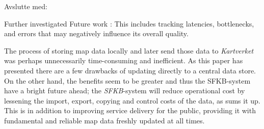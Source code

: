 Avslutte med:



Further investigated 	Future work : This includes tracking latencies, bottlenecks, and errors that may negatively influence its overall quality. \cite{giuliani2013}

The process of storing map data locally and later send those data to \textit{Kartverket} was perhaps unnecessarily time-consuming and inefficient. As this paper has presented there are a few drawbacks of updating directly to a central data store. On the other hand, the benefits seem to be greater and thus the SFKB-system have a bright future ahead; the \textit{SFKB}-system will reduce operational cost by lessening the import, export, copying and control costs of the data, as \cite{Kartverket2017e} sums it up.  This is in addition to improving service delivery for the public, providing it with fundamental and reliable map data freshly updated at all times. 
